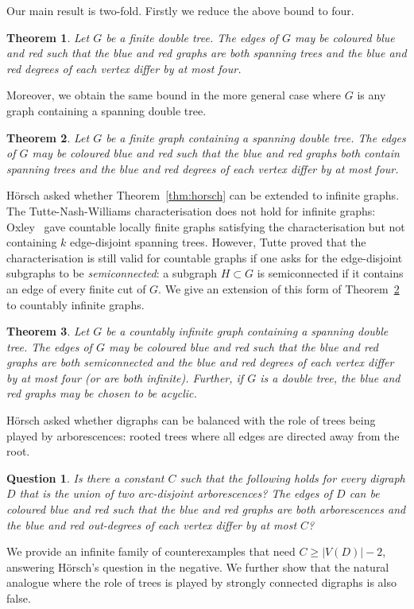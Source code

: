 \documentclass[11pt, reqno, a4paper]{article}
\newtheorem{theorem}{Theorem}
\newtheorem{question}{Question}
\theoremstyle{definition}
\numberwithin{equation}{section}
\begin{document}
Our main result is two-fold. Firstly we reduce the above bound to four.

\begin{theorem}\label{thm:2trees}
Let $G$ be a finite double tree. 
The edges of $G$ may be coloured blue and red such that the blue and red graphs are both spanning trees and the blue and red degrees of each vertex differ by at most four.
\end{theorem}
Moreover, we obtain the same bound in the more general case where $G$ is any graph containing a spanning double tree.

\begin{theorem}\label{thm:2treesgeneral}
Let $G$ be a finite graph containing a spanning double tree. 
The edges of $G$ may be coloured blue and red such that the blue and red graphs both contain spanning trees and the blue and red degrees of each vertex differ by at most four.
\end{theorem}

H\"{o}rsch asked whether Theorem~\ref{thm:horsch} can be extended to infinite graphs. 
The Tutte-Nash-Williams characterisation does not hold for infinite graphs: Oxley~\cite{oxley1979packing} gave countable locally finite graphs satisfying the characterisation but not containing $k$ edge-disjoint spanning trees.
However, Tutte proved that the characterisation is still valid for countable graphs if one asks for the edge-disjoint subgraphs to be \emph{semiconnected}: a subgraph $H \subset G$ is semiconnected if it contains an edge of every finite cut of $G$. 
We give an extension of this form of Theorem~\ref{thm:2treesgeneral} to countably infinite graphs.

\begin{theorem}\label{cor:infinite}
Let $G$ be a countably infinite graph containing a spanning double tree. 
The edges of $G$ may be coloured blue and red such that the blue and red graphs are both semiconnected and the blue and red degrees of each vertex differ by at most four \textnormal{(}or are both infinite\textnormal{)}.
Further, if $G$ is a double tree, the blue and red graphs may be chosen to be acyclic.
\end{theorem}

H\"orsch asked whether digraphs can be balanced with the role of trees being played by arborescences: rooted trees where all edges are directed away from the root.

\begin{question}\label{qu:digraphs}
Is there a constant $C$ such that the following holds for every digraph $D$ that is the union of two arc-disjoint arborescences? The edges of $D$ can be coloured blue and red such that the blue and red graphs are both arborescences and the blue and red out-degrees of each vertex differ by at most \(C\)?
\end{question}
We provide an infinite family of counterexamples that need $C \geqslant |V(D)| - 2$, answering H\"orsch's question in the negative.
We further show that the natural analogue where the role of trees is played by strongly connected digraphs is also false.
\end{document}
